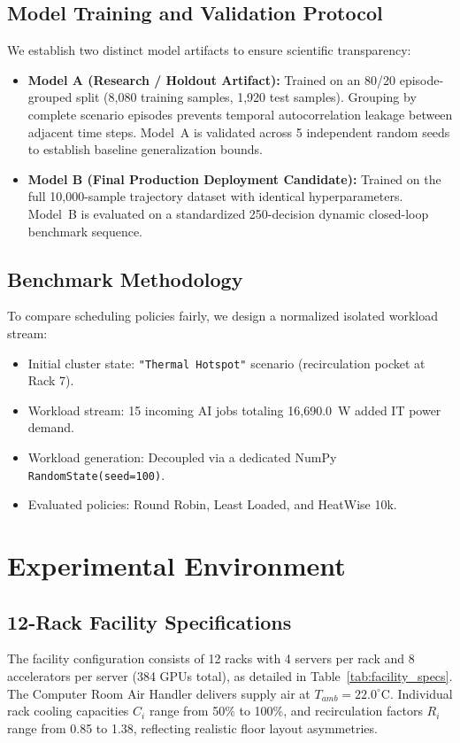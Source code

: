 \documentclass[conference,10pt]{IEEEtran}
\begin{document}
\subsection{Model Training and Validation Protocol}
We establish two distinct model artifacts to ensure scientific transparency:
\begin{itemize}
    \item \textbf{Model A (Research / Holdout Artifact):} Trained on an 80/20 episode-grouped split (8,080 training samples, 1,920 test samples). Grouping by complete scenario episodes prevents temporal autocorrelation leakage between adjacent time steps. Model~A is validated across 5 independent random seeds to establish baseline generalization bounds.
    \item \textbf{Model B (Final Production Deployment Candidate):} Trained on the full 10,000-sample trajectory dataset with identical hyperparameters. Model~B is evaluated on a standardized 250-decision dynamic closed-loop benchmark sequence.
\end{itemize}

\subsection{Benchmark Methodology}
To compare scheduling policies fairly, we design a normalized isolated workload stream:
\begin{itemize}
    \item Initial cluster state: \texttt{"Thermal Hotspot"} scenario (recirculation pocket at Rack 7).
    \item Workload stream: 15 incoming AI jobs totaling 16,690.0~W added IT power demand.
    \item Workload generation: Decoupled via a dedicated NumPy \texttt{RandomState(seed=100)}.
    \item Evaluated policies: Round Robin, Least Loaded, and HeatWise 10k.
\end{itemize}

\section{Experimental Environment}
\label{sec:environment}

\subsection{12-Rack Facility Specifications}
The facility configuration consists of 12 racks with 4 servers per rack and 8 accelerators per server (384 GPUs total), as detailed in Table~\ref{tab:facility_specs}. The Computer Room Air Handler delivers supply air at $T_{amb} = 22.0^\circ\text{C}$. Individual rack cooling capacities $C_i$ range from 50\% to 100\%, and recirculation factors $R_i$ range from 0.85 to 1.38, reflecting realistic floor layout asymmetries.
\end{document}
